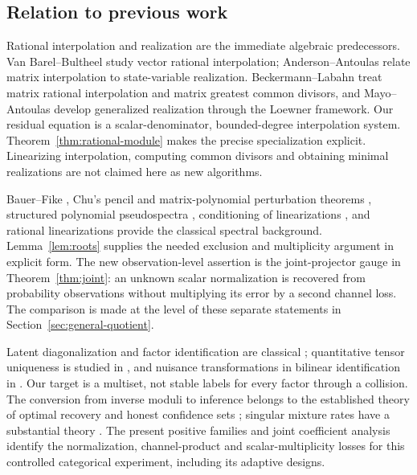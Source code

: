 \documentclass[11pt,reqno]{amsart}
\numberwithin{equation}{section}
\theoremstyle{definition}\newtheorem{definition}[theorem]{Definition}
\theoremstyle{remark}\newtheorem{remark}[theorem]{Remark}
\begin{document}
\subsection{Relation to previous work}
Rational interpolation and realization are the immediate algebraic
predecessors. Van Barel--Bultheel \cite{VBB} study vector rational
interpolation; Anderson--Antoulas \cite{AA90} relate matrix interpolation
to state-variable realization. Beckermann--Labahn \cite{BL00} treat
matrix rational interpolation and matrix greatest common divisors, and
Mayo--Antoulas \cite{MA07} develop generalized realization through the
Loewner framework. Our residual equation is a scalar-denominator,
bounded-degree interpolation system. Theorem~\ref{thm:rational-module}
makes the precise specialization explicit. Linearizing interpolation,
computing common divisors and obtaining minimal realizations are not
claimed here as new algorithms.

Bauer--Fike \cite{BF}, Chu's pencil and matrix-polynomial perturbation
theorems \cite{Chu87,Chu03}, structured polynomial pseudospectra
\cite{TH}, conditioning of linearizations \cite{HMT}, and rational
linearizations \cite{SB} provide the classical spectral background.
Lemma~\ref{lem:roots} supplies the needed exclusion and multiplicity
argument in explicit form. The new observation-level assertion is the
joint-projector gauge in Theorem~\ref{thm:joint}: an unknown scalar
normalization is recovered from probability observations without
multiplying its error by a second channel loss. The comparison is made
at the level of these separate statements in
Section~\ref{sec:general-quotient}.

Latent diagonalization and factor identification are classical
\cite{AMR,BJR}; quantitative tensor uniqueness is studied in
\cite{BCV}, and nuisance transformations in bilinear identification
in \cite{LLB}. Our target is a multiset, not stable labels for every
factor through a collision. The conversion from inverse moduli to
inference belongs to the established theory of optimal recovery and
honest confidence sets \cite{Donoho,CaiLow,Dufour}; singular mixture
rates have a substantial theory \cite{HN}. The present positive
families and joint coefficient analysis identify the normalization,
channel-product and scalar-multiplicity losses for this controlled
categorical experiment, including its adaptive designs.












\end{document}

